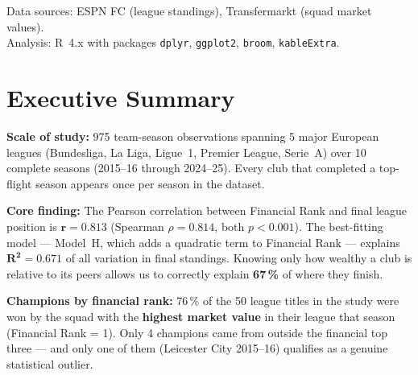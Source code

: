\documentclass[11pt, a4paper]{article}
\begin{document}
\begin{titlepage}
\begin{abstract}
    \medskip\noindent
    \textbf{Keywords:} football economics, squad market value, Financial Fair
    Play, sports analytics, regression, outlier analysis
  \end{abstract}

  \vfill
  {\small\color{gray}
    Data sources: ESPN FC (league standings), Transfermarkt (squad market values).\\
    Analysis: R~4.x with packages \texttt{dplyr}, \texttt{ggplot2}, \texttt{broom},
    \texttt{kableExtra}.}
\end{titlepage}

\clearpage
\tableofcontents
\clearpage

\section{Executive Summary}

\begin{statbox}
  \textbf{Scale of study:} 975 team-season observations spanning 5 major European
  leagues (Bundesliga, La Liga, Ligue~1, Premier League, Serie~A) over 10 complete
  seasons (2015--16 through 2024--25). Every club that completed a top-flight
  season appears once per season in the dataset.
\end{statbox}

\begin{findingbox}
  \textbf{Core finding:} The Pearson correlation between Financial Rank and final
  league position is \(\mathbf{r = 0.813}\) (Spearman \(\rho = 0.814\), both
  \(p < 0.001\)). The best-fitting model --- Model~H, which adds a quadratic term
  to Financial Rank --- explains \(\mathbf{R^{2} = 0.671}\) of all variation in
  final standings. Knowing only how wealthy a club is relative to its peers allows
  us to correctly explain \textbf{67\,\%} of where they finish.
\end{findingbox}

\begin{successbox}
  \textbf{Champions by financial rank:} 76\,\% of the 50 league titles in the study
  were won by the squad with the \textbf{highest market value} in their league that
  season (Financial Rank = 1). Only 4 champions came from outside the financial top
  three --- and only one of them (Leicester City 2015--16) qualifies as a genuine
  statistical outlier.
\end{successbox}
\end{document}

